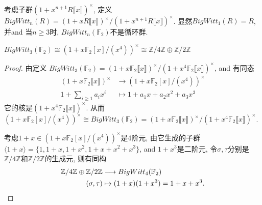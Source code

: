 考虑子群$(1+x^{n+1}R\llbracket x\rrbracket )^{\times}$, 定义$BigWitt_n(R)=(1+xR\llbracket x\rrbracket )^{\times}/(1+x^{n+1}R\llbracket x\rrbracket )^{\times}$.  显然$BigWitt_1(R)=R$,  并and 当$n\geq 3$时, $BigWitt_n(\mathbb{F}_2)$不是循环群. 


\begin{example} 
\label{ex:W3(F2)}
	$BigWitt_3(\mathbb{F}_2)\cong (1+x\mathbb{F}_2[x]/(x^{4}))^{\times}\cong \mathbb{Z}/4 \mathbb{Z} \oplus\mathbb{Z}/2 \mathbb{Z}$
\end{example}
\begin{proof}
	由定义
$BigWitt_3(\mathbb{F}_2)=(1+x \mathbb{F}_2\llbracket x\rrbracket )^{\times}/(1+x^4 \mathbb{F}_2\llbracket x\rrbracket )^{\times}$, and 有同态
\begin{align*}
(1+x \mathbb{F}_2\llbracket x\rrbracket )^{\times} &\longrightarrow (1+x \mathbb{F}_2[x]/(x^4))^{\times}\\
1+\sum_{i\geq 1}a_i x^i &\mapsto 1+a_1x+a_2x^2+a_3x^3
\end{align*}
它的核是$(1+x^4 \mathbb{F}_2\llbracket x\rrbracket )^{\times}$.
从而$(1+x \mathbb{F}_2[x]/(x^4))^{\times} \cong BigWitt_3(\mathbb{F}_2)=(1+x \mathbb{F}_2\llbracket x\rrbracket )^{\times}/(1+x^4 \mathbb{F}_2\llbracket x\rrbracket )^{\times}$.

考虑$1+x\in (1+x \mathbb{F}_2[x]/(x^4))^{\times}$是$4$阶元, 由它生成的子群$\langle 1+x \rangle = \{1,1+x,1+x^2,1+x+x^2+x^3\}$, and $1+x^3$是二阶元, 令$\sigma,\tau$分别是$\mathbb{Z}/4 \mathbb{Z}$和$\mathbb{Z}/2 \mathbb{Z}$的生成元, 则有同构
	\begin{align*}
	\mathbb{Z}/4 \mathbb{Z} \oplus \mathbb{Z}/2 \mathbb{Z} &\longrightarrow BigWitt_4(\mathbb{F}_2) \\
	(\sigma,\tau) & \mapsto (1+x)(1+x^3)=1+x+x^3. \qedhere
	\end{align*}
\end{proof}

